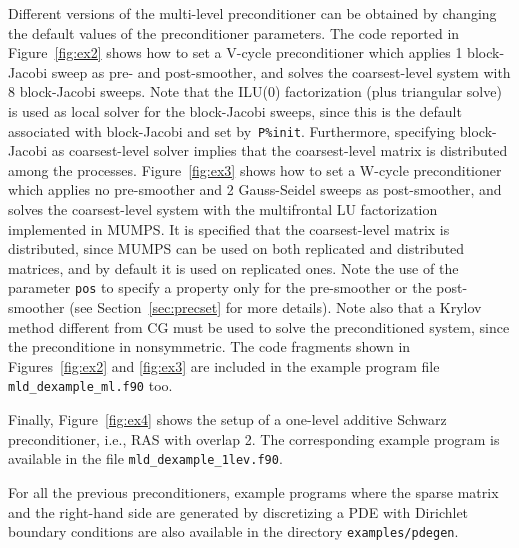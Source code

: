 Different versions of the multi-level preconditioner can be obtained by changing
the default values of the preconditioner parameters. The code reported in
Figure~\ref{fig:ex2} shows how to set a V-cycle preconditioner
which applies 1 block-Jacobi sweep as pre- and post-smoother,
and solves the coarsest-level system with 8 block-Jacobi sweeps.
Note that the ILU(0) factorization (plus triangular solve) is used as
local solver for the block-Jacobi sweeps, since this is the default associated
with block-Jacobi and set by~\verb|P%init|.
Furthermore, specifying block-Jacobi as coarsest-level
solver implies that the coarsest-level matrix is distributed
among the processes.
Figure~\ref{fig:ex3} shows how to set a W-cycle preconditioner which
applies no pre-smoother and 2 Gauss-Seidel sweeps as post-smoother,
and solves the coarsest-level system with the multifrontal LU factorization
implemented in MUMPS. It is specified that the coarsest-level
matrix is distributed, since MUMPS can be used on both
replicated and distributed matrices, and by default
it is used on replicated ones. Note the use of the parameter \verb|pos|
to specify a property only for the pre-smoother or the post-smoother
(see Section~\ref{sec:precset} for more details).
Note also that a Krylov method different from CG must be used to solve
the preconditioned system, since the preconditione in nonsymmetric.
The code fragments shown in Figures~\ref{fig:ex2} and \ref{fig:ex3} are
included in the example program file \verb|mld_dexample_ml.f90| too.

Finally, Figure~\ref{fig:ex4} shows the setup of a one-level
additive Schwarz preconditioner, i.e., RAS with overlap 2. The
corresponding example program is available in the file
\verb|mld_dexample_1lev.f90|. 

For all the previous preconditioners, example programs where the sparse matrix and
the right-hand side are generated by discretizing a PDE with Dirichlet
boundary conditions are also available in the directory \verb|examples/pdegen|.



